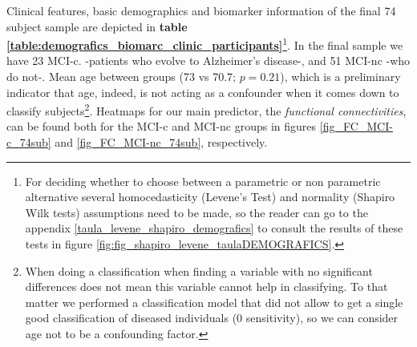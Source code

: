\documentclass[a4paper,12pt]{elsarticle}  %
\begin{document}
	
		Clinical features, basic demographics and biomarker information of the final 74 subject sample are depicted in \textbf{table \ref{table:demografics_biomarc_clinic_participants}}\footnote{For deciding whether to choose between a parametric or non parametric alternative several homocedasticity (Levene's Test) and normality (Shapiro Wilk tests) assumptions need to be made, so the reader can go to the appendix \ref{taula_levene_shapiro_demografics} to consult the results of these tests in figure \ref{fig:fig_shapiro_levene_taulaDEMOGRAFICS}.}.  In the final sample we have 23 MCI-c. -patients who evolve to Alzheimer's disease-, and 51 MCI-nc -who do not-. Mean age between groups (73 vs 70.7; $p = 0.21$), which is a preliminary indicator that age, indeed, is not acting as a confounder when it comes down to classify subjects\footnote{When doing a classification when finding a variable with no significant differences does not mean this variable cannot help in classifying. To that matter we performed a classification model that did not allow to get a single good classification of diseased individuals (0 sensitivity), so we can consider age not to be a confounding factor.}. Heatmaps for our main predictor, the \textit{functional connectivities}, can be found both for the MCI-c and MCI-nc groups in figures \ref{fig_FC_MCI-c_74sub} and \ref{fig_FC_MCI-nc_74sub}, respectively.
				
		
		
		
		\FloatBarrier
				
\end{document}

